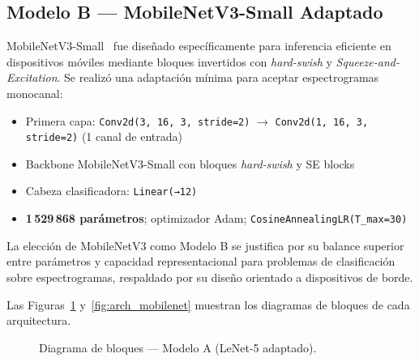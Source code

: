 \documentclass[conference]{IEEEtran}
\begin{document}
\subsection{Modelo B — MobileNetV3-Small Adaptado}

MobileNetV3-Small~\cite{howard2019searching} fue diseñado específicamente para
inferencia eficiente en dispositivos móviles mediante bloques invertidos con
\textit{hard-swish} y \textit{Squeeze-and-Excitation}.  Se realizó una
adaptación mínima para aceptar espectrogramas monocanal:

\begin{itemize}
  \item Primera capa: \texttt{Conv2d(3,\,16,\,3,\,stride=2)} $\rightarrow$
        \texttt{Conv2d(1,\,16,\,3,\,stride=2)} (1 canal de entrada)
  \item Backbone MobileNetV3-Small con bloques \textit{hard-swish} y SE blocks
  \item Cabeza clasificadora: \texttt{Linear(→12)}
  \item \textbf{1\,529\,868 parámetros}; optimizador Adam;
        \texttt{CosineAnnealingLR(T\_max=30)}
\end{itemize}

La elección de MobileNetV3 como Modelo B se justifica por su balance superior
entre parámetros y capacidad representacional para problemas de clasificación
sobre espectrogramas, respaldado por su diseño orientado a dispositivos de borde.

Las Figuras~\ref{fig:arch_lenet} y~\ref{fig:arch_mobilenet} muestran los
diagramas de bloques de cada arquitectura.

\begin{figure}[htbp]
\centering
{}
\caption{Diagrama de bloques — Modelo A (LeNet-5 adaptado).}
\label{fig:arch_lenet}
\end{figure}
\end{document}

